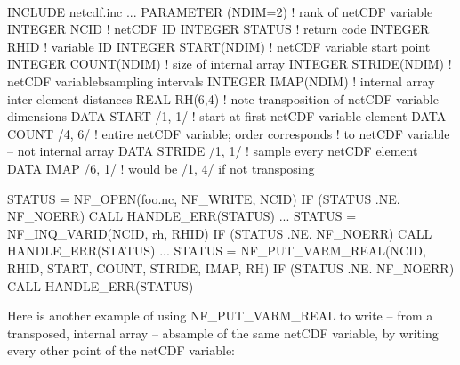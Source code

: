  

I\+N\+C\+L\+U\+DE \textquotesingle{}netcdf.\+inc\textquotesingle{} ... P\+A\+R\+A\+M\+E\+T\+ER (N\+D\+IM=2) ! rank of net\+C\+DF variable I\+N\+T\+E\+G\+ER N\+C\+ID ! net\+C\+DF ID I\+N\+T\+E\+G\+ER S\+T\+A\+T\+US ! return code I\+N\+T\+E\+G\+ER R\+H\+ID ! variable ID I\+N\+T\+E\+G\+ER S\+T\+A\+R\+T(\+N\+D\+I\+M) ! net\+C\+DF variable start point I\+N\+T\+E\+G\+ER C\+O\+U\+N\+T(\+N\+D\+I\+M) ! size of internal array I\+N\+T\+E\+G\+ER S\+T\+R\+I\+D\+E(\+N\+D\+I\+M) ! net\+C\+DF variablebsampling intervals I\+N\+T\+E\+G\+ER I\+M\+A\+P(\+N\+D\+I\+M) ! internal array inter-\/element distances R\+E\+AL R\+H(6,4) ! note transposition of net\+C\+DF variable dimensions D\+A\+TA S\+T\+A\+RT /1, 1/ ! start at first net\+C\+DF variable element D\+A\+TA C\+O\+U\+NT /4, 6/ ! entire net\+C\+DF variable; order corresponds ! to net\+C\+DF variable -- not internal array D\+A\+TA S\+T\+R\+I\+DE /1, 1/ ! sample every net\+C\+DF element D\+A\+TA I\+M\+AP /6, 1/ ! would be /1, 4/ if not transposing

S\+T\+A\+T\+US = N\+F\+\_\+\+O\+P\+EN(\textquotesingle{}foo.\+nc\textquotesingle{}, N\+F\+\_\+\+W\+R\+I\+TE, N\+C\+ID) IF (S\+T\+A\+T\+US .NE. N\+F\+\_\+\+N\+O\+E\+RR) C\+A\+LL H\+A\+N\+D\+L\+E\+\_\+\+E\+R\+R(\+S\+T\+A\+T\+U\+S) ... S\+T\+A\+T\+US = N\+F\+\_\+\+I\+N\+Q\+\_\+\+V\+A\+R\+ID(N\+C\+ID, \textquotesingle{}rh\textquotesingle{}, R\+H\+ID) IF (S\+T\+A\+T\+US .NE. N\+F\+\_\+\+N\+O\+E\+RR) C\+A\+LL H\+A\+N\+D\+L\+E\+\_\+\+E\+R\+R(\+S\+T\+A\+T\+U\+S) ... S\+T\+A\+T\+US = N\+F\+\_\+\+P\+U\+T\+\_\+\+V\+A\+R\+M\+\_\+\+R\+E\+A\+L(\+N\+C\+I\+D, R\+H\+I\+D, S\+T\+A\+R\+T, C\+O\+U\+N\+T, S\+T\+R\+I\+D\+E, I\+M\+A\+P, R\+H) IF (S\+T\+A\+T\+US .NE. N\+F\+\_\+\+N\+O\+E\+RR) C\+A\+LL H\+A\+N\+D\+L\+E\+\_\+\+E\+R\+R(\+S\+T\+A\+T\+U\+S)

Here is another example of using N\+F\+\_\+\+P\+U\+T\+\_\+\+V\+A\+R\+M\+\_\+\+R\+E\+AL to write – from a transposed, internal array – absample of the same net\+C\+DF variable, by writing every other point of the net\+C\+DF variable\+:

 

